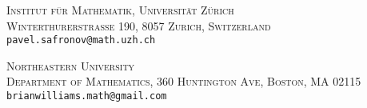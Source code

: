 \documentclass[10pt, oneside]{article}
\begin{document}
\textsc{Institut f\"ur Mathematik, Universit\"at Z\"urich}\\
\textsc{Winterthurerstrasse 190, 8057 Zurich, Switzerland}\\
\texttt{pavel.safronov@math.uzh.ch}\\
\vspace{-5pt}

\textsc{Northeastern University}\\
\textsc{Department of Mathematics, 360 Huntington Ave, Boston, MA 02115}\\
\texttt{brianwilliams.math@gmail.com}\\
\end{document}
